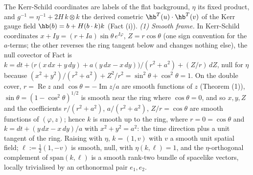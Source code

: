 The Kerr-Schild coordinates are labels of the flat background, $\eta$ its fixed product, and $g^{-1} = \eta^{-1} + 2H\,k \otimes k$ the derived cometric $\hb^{T}(u) \cdot \hb^{T}(v)$ of the Kerr gauge field $\hb(b) = b + H(b \cdot k)k$ (Fact (i)). \emph{(1) Smooth frame.} In Kerr-Schild coordinates $x + Iy = (r + Ia)\sin\theta\,e^{I\varphi}$, $Z = r\cos\theta$ (one sign convention for the $a$-terms; the other reverses the ring tangent below and changes nothing else), the null covector of Fact  is $k = dt + \bigl(r(x\,dx + y\,dy) + a(y\,dx - x\,dy)\bigr)/(r^2 + a^2) + (Z/r)\,dZ$, null for $\eta$ because $(x^2 + y^2)/(r^2 + a^2) + Z^2/r^2 = \sin^2\theta + \cos^2\theta = 1$. On the double cover, $r = \operatorname{Re} z$ and $\cos\theta = -\operatorname{Im} z/a$ are smooth functions of $z$ (Theorem (1)), $\sin\theta = (1 - \cos^2\theta)^{1/2}$ is smooth near the ring where $\cos\theta = 0$, and so $x, y, Z$ and the coefficients $r/(r^2 + a^2)$, $a/(r^2 + a^2)$, $Z/r = \cos\theta$ are smooth functions of $(\varphi, z)$; hence $k$ is smooth up to the ring, where $r = 0 = \cos\theta$ and $k = dt + (y\,dx - x\,dy)/a$ with $x^2 + y^2 = a^2$: the time direction plus a unit tangent of the ring. Raising with $\eta$, $k = (1, v)$ with $v$ a smooth unit spatial field; $\ell := \tfrac12(1, -v)$ is smooth, null, with $\eta(k,\ell) = 1$, and the $\eta$-orthogonal complement of $\mathrm{span}(k,\ell)$ is a smooth rank-two bundle of spacelike vectors, locally trivialised by an orthonormal pair $e_1, e_2$.

